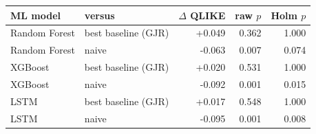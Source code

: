 \begin{tabular}{llrrr}
\hline
ML model & versus & $\Delta$ QLIKE & raw $p$ & Holm $p$ \\
\hline
Random Forest & best baseline (GJR) & +0.049 & 0.362 & 1.000 \\
Random Forest & naive & -0.063 & 0.007 & 0.074 \\
XGBoost & best baseline (GJR) & +0.020 & 0.531 & 1.000 \\
XGBoost & naive & -0.092 & 0.001 & 0.015 \\
LSTM & best baseline (GJR) & +0.017 & 0.548 & 1.000 \\
LSTM & naive & -0.095 & 0.001 & 0.008 \\
\hline
\end{tabular}
